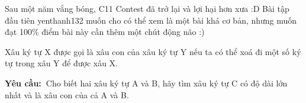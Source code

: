 Sau một năm vắng bóng, C11 Contest đã trở lại và lợi hại hơn xưa :D Bài tập đầu tiên yenthanh132 muốn cho có thể xem là một bài khá cơ bản, nhưng muốn đạt 100\% điểm bài này cần thêm một chút động não :)

Xâu ký tự X được gọi là xâu con của xâu ký tự Y nếu ta có thể xoá đi một số ký tự trong xâu Y để được xâu X.

\textbf{Yêu cầu: }Cho biết hai xâu ký tự A và B, hãy tìm xâu ký tự C có độ dài lớn nhất và là xâu con của cả A và B.